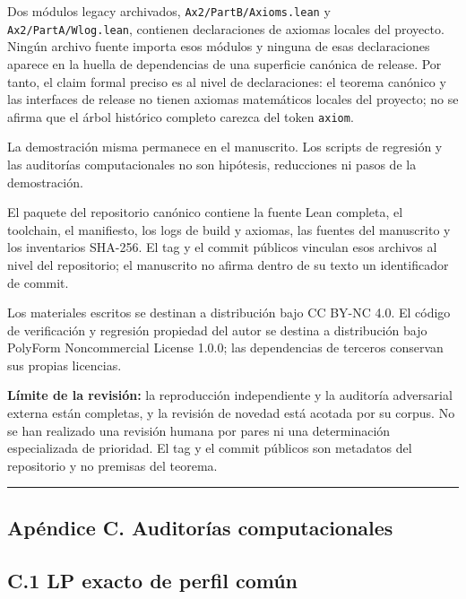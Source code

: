 \documentclass[spanish,11pt,a4paper]{article}
\begin{document}
Dos módulos legacy archivados, \nolinkurl{Ax2/PartB/Axioms.lean} y
\nolinkurl{Ax2/PartA/Wlog.lean}, contienen declaraciones de axiomas locales
del proyecto. Ningún archivo fuente importa esos módulos y ninguna de
esas declaraciones aparece en la huella de dependencias de una
superficie canónica de release. Por tanto, el claim formal preciso es al
nivel de declaraciones: el teorema canónico y las interfaces de release
no tienen axiomas matemáticos locales del proyecto; no se afirma que el
árbol histórico completo carezca del token \nolinkurl{axiom}.

La demostración misma permanece en el manuscrito. Los scripts de
regresión y las auditorías computacionales no son hipótesis, reducciones
ni pasos de la demostración.

El paquete del repositorio canónico contiene la fuente Lean completa, el
toolchain, el manifiesto, los logs de build y axiomas, las fuentes del
manuscrito y los inventarios SHA-256. El tag y el commit públicos
vinculan esos archivos al nivel del repositorio; el manuscrito no afirma
dentro de su texto un identificador de commit.

Los materiales escritos se destinan a distribución bajo CC BY-NC 4.0. El
código de verificación y regresión propiedad del autor se destina a
distribución bajo PolyForm Noncommercial License 1.0.0; las dependencias
de terceros conservan sus propias licencias.

\textbf{Límite de la revisión:} la reproducción independiente y la
auditoría adversarial externa están completas, y la revisión de novedad
está acotada por su corpus. No se han realizado una revisión humana por
pares ni una determinación especializada de prioridad. El tag y el
commit públicos son metadatos del repositorio y no premisas del teorema.

\begin{center}\rule{0.5\linewidth}{0.5pt}\end{center}

\subsection{Apéndice C. Auditorías
computacionales}\label{apuxe9ndice-c.-auditoruxedas-computacionales}

\subsection{C.1 LP exacto de perfil
común}\label{c.1-lp-exacto-de-perfil-comuxfan}
\end{document}
